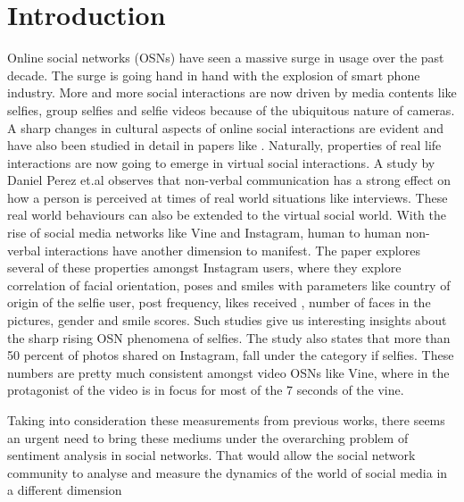 \section{Introduction}
Online social networks (OSNs) have seen a massive surge in usage over the past decade. The surge is going hand in hand with the explosion of smart phone industry. More and more social interactions are now driven by media contents like selfies, group selfies and selfie videos because of the ubiquitous nature of cameras. A sharp changes in cultural aspects of online social interactions are evident and have also been studied in detail in papers like \cite{Souza2015}. Naturally, properties of real life interactions are now going to emerge in virtual social interactions. A study by Daniel Perez et.al \cite{7175072} observes that non-verbal communication has a strong effect on how a person is perceived at times of real world situations like interviews. These real world behaviours can also be extended to the virtual social world. With the rise of social media networks like Vine and Instagram, human to human non-verbal interactions have another dimension to manifest. 
The \cite{Souza2015} paper explores several of these properties amongst Instagram users, where they explore correlation of facial orientation, poses and smiles with parameters like country of origin of the selfie user, post frequency, likes received , number of faces in the pictures, gender and smile scores. Such studies give us interesting insights about the sharp rising OSN phenomena of selfies. The study also states that more than 50 percent of photos shared on Instagram, fall under the category if selfies. These numbers are pretty much consistent amongst video OSNs like Vine, where in the protagonist of the video is in focus for most of the 7 seconds of the vine. 
\par
Taking into consideration these measurements from previous works, there seems an urgent need to bring these mediums under the overarching problem of sentiment analysis in social networks. That would allow the social network community to analyse and measure the dynamics of the world of social media in a different dimension